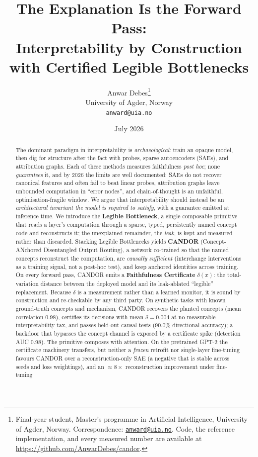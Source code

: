 \documentclass[11pt]{article}
\title{\textbf{The Explanation Is the Forward Pass:\\
Interpretability by Construction with Certified Legible Bottlenecks}}
\author{Anwar Debes\thanks{Final-year student, Master's programme in Artificial
Intelligence, University of Agder, Norway. Correspondence:
\href{mailto:anward@uia.no}{\texttt{anward@uia.no}}. Code, the reference
implementation, and every measured number are available at
\url{https://github.com/AnwarDebes/candor}.}\\[2pt]
University of Agder, Norway\\
\texttt{anward@uia.no}}
\date{July 2026}
\providecommand{\deltaMain}{0.004}\providecommand{\deltaMainPct}{0.40}
\providecommand{\recovery}{0.98}\providecommand{\recoveryMin}{0.95}\providecommand{\monoMargin}{0.50}
\providecommand{\dirRel}{90.0}\providecommand{\dirIrrel}{95.0}
\providecommand{\trojanAuc}{0.98}\providecommand{\trojanDeltaClean}{0.005}\providecommand{\trojanDeltaTrojan}{0.20}
\providecommand{\ftReconGain}{8}
\begin{document}
\maketitle

\begin{abstract}
The dominant paradigm in interpretability is \emph{archaeological}: train an opaque
model, then dig for structure after the fact with probes, sparse autoencoders
(SAEs), and attribution graphs. Each of these methods measures faithfulness
\emph{post hoc}; none \emph{guarantees} it, and by 2026 the limits are well
documented: SAEs do not recover canonical features and often fail to beat linear
probes, attribution graphs leave unbounded computation in ``error nodes'', and
chain-of-thought is an unfaithful, optimisation-fragile window. We argue that
interpretability should instead be an \emph{architectural invariant the model is
required to satisfy}, with a guarantee emitted at inference time. We introduce the
\textbf{Legible Bottleneck}, a single composable primitive that reads a layer's
computation through a sparse, typed, persistently named concept code and
reconstructs it; the unexplained remainder, the \emph{leak}, is kept and measured
rather than discarded. Stacking Legible Bottlenecks yields \textbf{CANDOR}
(Concept-ANchored Disentangled Output Routing), a network co-trained so that the
named concepts reconstruct the computation, are \emph{causally sufficient}
(interchange interventions as a training signal, not a post-hoc test), and keep
anchored identities across training. On every forward pass, CANDOR emits a
\textbf{Faithfulness Certificate} $\delta(x)$: the total-variation distance between
the deployed model and its leak-ablated ``legible'' replacement. Because $\delta$
is a measurement rather than a learned monitor, it is sound by construction and
re-checkable by any third party. On synthetic tasks with known ground-truth
concepts and mechanism, CANDOR recovers the planted concepts (mean correlation
\recovery{}), certifies its decisions with mean $\delta=\deltaMain{}$ at no
measurable interpretability tax, and passes held-out causal tests (\dirRel\%
directional accuracy); a backdoor that bypasses the concept channel is exposed by a
certificate spike (detection AUC \trojanAuc{}). The primitive composes with
attention. On the pretrained GPT-2 the certificate machinery transfers, but neither a
\emph{frozen} retrofit nor single-layer fine-tuning favours CANDOR over a
reconstruction-only SAE (a negative that is stable across seeds and loss weightings),
and an $\approx\ftReconGain{}\times$ reconstruction improvement under fine-tuning

\end{abstract}
\end{document}
